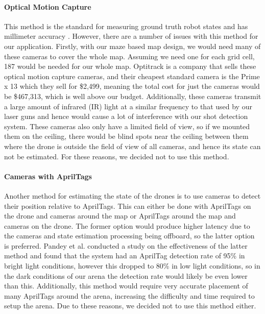 \documentclass{report_template_oxford}
\begin{document}
\paragraph{Optical Motion Capture} This method is the standard for measuring ground truth robot states and has millimeter accuracy \cite{liu2018viconmavlinksoftwaretoolindoor}. However, there are a number of issues with this method for our application. Firstly, with our maze based map design, we would need many of these cameras to cover the whole map. Assuming we need one for each grid cell, 187 would be needed for our whole map. Optitrack is a company that sells these optical motion capture cameras, and their cheapest standard camera is the Prime x 13 \cite{Prime13Optitrack} which they sell for \$2,499, meaning the total cost for just the cameras would be \$467,313, which is well above our budget. Additionally, these cameras transmit a large amount of infrared (IR) light at a similar frequency to that used by our laser guns and hence would cause a lot of interference with our shot detection system. These cameras also only have a limited field of view, so if we mounted them on the ceiling, there would be blind spots near the ceiling between them where the drone is outside the field of view of all cameras, and hence its state can not be estimated. For these reasons, we decided not to use this method.

\paragraph{Cameras with AprilTags} Another method for estimating the state of the drones is to use cameras to detect their position relative to AprilTags. This can either be done with AprilTags on the drone and cameras around the map or AprilTags around the map and cameras on the drone. The former option would produce higher latency due to the cameras and state estimation processing being offboard, so the latter option is preferred. Pandey et al. \cite{aprilTagStateEstimation} conducted a study on the effectiveness of the latter method and found that the system had an AprilTag detection rate of 95\% in bright light conditions, however this dropped to 80\% in low light conditions, so in the dark conditions of our arena the detection rate would likely be even lower than this. Additionally, this method would require very accurate placement of many AprilTags around the arena, increasing the difficulty and time required to setup the arena. Due to these reasons, we decided not to use this method either.
\end{document}
